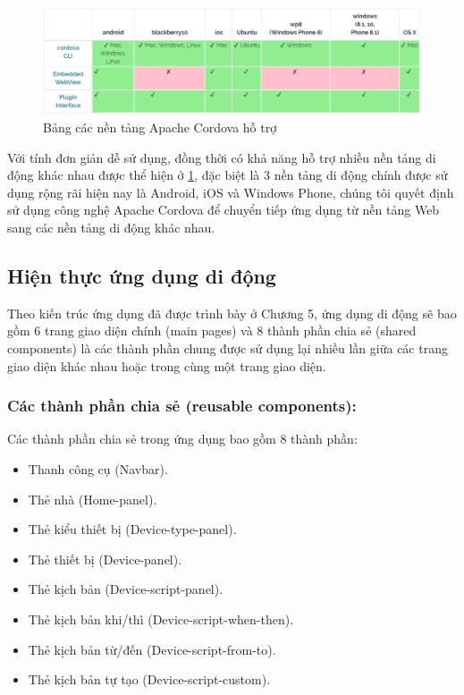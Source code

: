 \documentclass[12pt,a4paper,oneside]{extbook}
\begin{document}
\begin{figure}[h]
  \centering
     \includegraphics[width=15cm]{6-cordova-platforms}
  \caption{Bảng các nền tảng Apache Cordova hỗ trợ}\label{fig:6-cordova-platforms}
\end{figure}

\noindent
Với tính đơn giản dễ sử dụng, đồng thời có khả năng hỗ trợ nhiều nền tảng di động khác nhau được thể hiện ở \ref{fig:6-cordova-platforms}, đặc biệt là 3 nền tảng di động chính được sử dụng rộng rãi hiện nay là Android, iOS và Windows Phone, chúng tôi quyết định sử dụng công nghệ Apache Cordova để chuyển tiếp ứng dụng từ nền tảng Web sang các nền tảng di động khác nhau.

\subsection{Hiện thực ứng dụng di động}
Theo kiến trúc ứng dụng đã được trình bày ở Chương 5, ứng dụng di động sẽ bao gồm 6 trang giao diện chính (main pages) và 8 thành phần chia sẻ (shared components) là các thành phần chung được sử dụng lại nhiều lần giữa các trang giao diện khác nhau hoặc trong cùng một trang giao diện.

\subsubsection{Các thành phần chia sẻ (reusable components):}

\noindent
Các thành phần chia sẻ trong ứng dụng bao gồm 8 thành phần:

\begin{itemize}[topsep=1mm,itemsep=-0.5mm]
\item Thanh công cụ (Navbar).
\item Thẻ nhà (Home-panel).
\item Thẻ kiểu thiết bị (Device-type-panel).
\item Thẻ thiết bị (Device-panel).
\item Thẻ kịch bản (Device-script-panel).
\item Thẻ kịch bản khi/thì (Device-script-when-then).
\item Thẻ kịch bản từ/đến (Device-script-from-to).
\item Thẻ kịch bản tự tạo (Device-script-custom).
\vspace{1mm}
\end{itemize}
\end{document}
